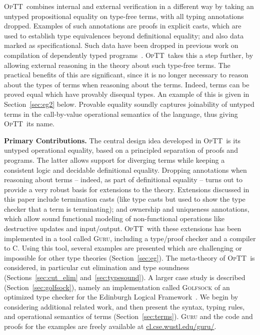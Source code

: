 \documentclass[preprint,natbib]{sigplanconf}
\newcommand{\optt}{\textsc{OpTT}}
\begin{document}
\optt\ combines internal and external verification in a different way
by taking an untyped propositional equality on type-free terms, with
all typing annotations dropped.  Examples of such annotations are
proofs in explicit casts, which are used to establish type
equivalences beyond definitional equality; and also data marked as
specificational.  Such data have been dropped in previous work on
compilation of dependently typed programs~\cite{brady+03}.  \optt\
takes this a step further, by allowing external reasoning in the
theory about such type-free terms.  The practical benefits of this are
significant, since it is no longer necessary to reason about the types
of terms when reasoning about the terms.  Indeed, terms can be proved
equal which have provably disequal types.  An example of this is given
in Section~\ref{sec:eg2} below.  Provable equality soundly captures
joinability of untyped terms in the call-by-value operational
semantics of the language, thus giving \optt\ its name.

\textbf{Primary Contributions.} The central design idea developed in
\optt\ is its untyped operational equality, based on a principled
separation of proofs and programs.  The latter allows support for
diverging terms while keeping a consistent logic and decidable
definitional equality.  Dropping annotations when reasoning about
terms -- indeed, as part of definitional equality -- turns out to
provide a very robust basis for extensions to the theory.  Extensions
discussed in this paper include termination casts (like type casts but
used to show the type checker that a term is terminating); and
ownership and uniqueness annotations, which allow sound functional
modeling of non-functional operations like destructive updates and
input/output.  \optt\ with these extensions has been implemented in a
tool called \textsc{Guru}, including a type/proof checker and a
compiler to C.  Using this tool, several examples are presented which
are challenging or impossible for other type theories
(Section~\ref{sec:eg}).  The meta-theory of \optt\ is considered, in
particular cut elimination and type soundness
(Sections~\ref{sec:cut_elim} and~\ref{sec:typesound}).  A larger case
study is described (Section~\ref{sec:golfsock}), namely an
implementation called \textsc{Golfsock} of an optimized type checker
for the Edinburgh Logical Framework~\cite{HHP93}.  We begin by
considering additional related work, and then present the syntax,
typing rules, and operational semantics of terms
(Section~\ref{sec:terms}).  \textsc{Guru} and the code and proofs for
the examples are freely available at \url{cl.cse.wustl.edu/guru/}.
\end{document}
